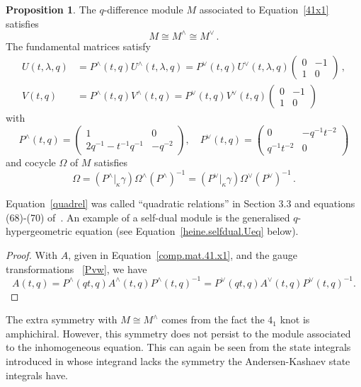 \documentclass[12pt,reqno]{amsart}
\theoremstyle{definition}
\newtheorem{proposition}[theorem]{Proposition}
\def\be{\begin{equation}}
\def\ee{\end{equation}}
\def\Om{\Omega}
\begin{document}
\begin{proposition}
\label{prop.M41duals}
The $q$-difference module $M$ associated to Equation~\eqref{41x1} satisfies
\be
  M
  \cong
  M^{\wedge}
  \cong
  M^{\vee} \,.
  \ee
The fundamental matrices satisfy
\be
\begin{aligned}
  U(t,\lambda,q)
  &=
  P^{\wedge}(t,q)
  U^{\wedge}(t,\lambda,q)
  =
  P^{\vee}(t,q)
  U^{\vee}(t,\lambda,q)
  \begin{pmatrix}
    0 & -1\\
    1 & 0
  \end{pmatrix}\,,\\
  V(t,q)
  &=
  P^{\wedge}(t,q)
  V^{\wedge}(t,q)
  =
  P^{\vee}(t,q)
  V^{\vee}(t,q)
  \begin{pmatrix}
    0 & -1\\
    1 & 0
  \end{pmatrix}
\end{aligned}
\ee
with
\be
\label{Pvw}
P^{\wedge}(t,q)
  =
  \begin{pmatrix}
1 & 0\\
2q^{-1}-t^{-1}q^{-1} & -q^{-2}
  \end{pmatrix}
  ,\quad
  P^{\vee}(t,q)
  =
  \begin{pmatrix}
0 & -q^{-1}t^{-2}\\
q^{-1}t^{-2} & 0
  \end{pmatrix} 
\ee
and cocycle $\Om$ of $M$ satisfies
  \be
  \label{quadrel}
  \Om = (P^{\wedge}|_{\kappa}\gamma) \Om^{\wedge}(P^{\wedge})^{-1}
  = (P^{\vee}|_{\kappa}\gamma) \Om^{\vee} (P^{\vee})^{-1} \,.
  \ee
\end{proposition}

Equation~\eqref{quadrel} was called ``quadratic relations'' in Section 3.3 and
equations (68)-(70) of~\cite{GZ:kashaev}. An example of a self-dual module is the
generalised $q$-hypergeometric equation (see Equation~\eqref{heine.selfdual.Ueq}
below). 

\begin{proof}
With $A$, given in Equation~\eqref{comp.mat.41.x1}, and the gauge transformations
~\eqref{Pvw}, we have
\be
A(t,q)
=
P^{\wedge}(qt,q)A^{\wedge}(t,q)P^{\wedge}(t,q)^{-1}
=
P^{\vee}(qt,q)A^{\vee}(t,q)P^{\vee}(t,q)^{-1}.
\ee
\end{proof}
The extra symmetry with $M \cong M^{\wedge}$ comes from the fact the $4_{1}$ knot
is amphichiral. However, this symmetry does not persist to the
module associated to the inhomogeneous equation. This can again be seen from
the state integrals introduced in \cite{GGMW:trivial} whose integrand lacks
the symmetry the Andersen-Kashaev state integrals have.
\end{document}
